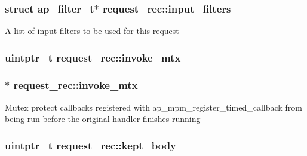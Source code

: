 \subsubsection[{\texorpdfstring{input\+\_\+filters}{input_filters}}]{\setlength{\rightskip}{0pt plus 5cm}struct {\bf ap\+\_\+filter\+\_\+t}$\ast$ request\+\_\+rec\+::input\+\_\+filters}\hypertarget{structrequest__rec_ab1dbefe53c7c3a3e24fe8281bbaea965}{}\label{structrequest__rec_ab1dbefe53c7c3a3e24fe8281bbaea965}
A list of input filters to be used for this request 
\subsubsection[{\texorpdfstring{invoke\+\_\+mtx}{invoke_mtx}}]{\setlength{\rightskip}{0pt plus 5cm}uintptr\+\_\+t request\+\_\+rec\+::invoke\+\_\+mtx}\hypertarget{structrequest__rec_a788a6c1515ad8e29356808cf85b50df3}{}\label{structrequest__rec_a788a6c1515ad8e29356808cf85b50df3}
\subsubsection[{\texorpdfstring{invoke\+\_\+mtx}{invoke_mtx}}]{$\ast$ request\+\_\+rec\+::invoke\+\_\+mtx}\hypertarget{structrequest__rec_ae5934a71ef71abf65eaace082d89a170}{}\label{structrequest__rec_ae5934a71ef71abf65eaace082d89a170}
Mutex protect callbacks registered with ap\+\_\+mpm\+\_\+register\+\_\+timed\+\_\+callback from being run before the original handler finishes running 
\subsubsection[{\texorpdfstring{kept\+\_\+body}{kept_body}}]{\setlength{\rightskip}{0pt plus 5cm}uintptr\+\_\+t request\+\_\+rec\+::kept\+\_\+body}\hypertarget{structrequest__rec_a6334659099a651e11c11716dedb79c2d}{}\label{structrequest__rec_a6334659099a651e11c11716dedb79c2d}
